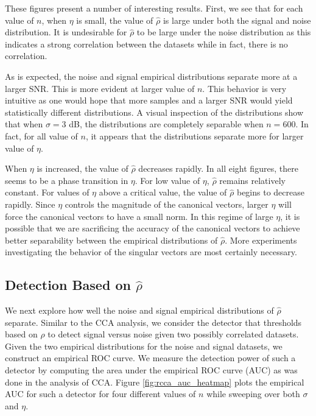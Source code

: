 These figures present a number of interesting results. First, we see that for each value
of $n$, when $\eta$ is small, the value of $\widehat{\rho}$ is large under both the signal
and noise distribution. It is undesirable for $\widehat{\rho}$ to be large under the noise
distribution as this indicates a strong correlation between the datasets while in fact,
there is no correlation. 

As is expected, the noise and signal empirical distributions separate more at a larger
SNR. This is more evident at larger value of $n$. This behavior is very intuitive as one
would hope that more samples and a larger SNR would yield statistically different
distributions. A visual inspection of the distributions show that when $\sigma=3$ dB, the
distributions are completely separable when $n=600$. In fact, for all value of $n$, it
appears that the distributions separate more for larger value of $\eta$. 

When $\eta$ is increased, the value of $\widehat{\rho}$ decreases rapidly. In all eight
figures, there seems to be a phase transition in $\eta$. For low value of $\eta$,
$\widehat{\rho}$ remains relatively constant. For values of $\eta$ above a critical value,
the value of $\widehat{\rho}$ begins to decrease rapidly. Since $\eta$ controls the
magnitude of the canonical vectors, larger $\eta$ will force the canonical vectors to have
a small norm. In this regime of large $\eta$, it is possible that we are sacrificing the
accuracy of the canonical vectors to achieve better separability between the empirical
distributions of $\widehat{\rho}$. More experiments investigating the behavior of the
singular vectors are most certainly necessary. 

\subsection{Detection Based on $\widehat{\rho}$}

We next explore how well the noise and signal empirical distributions of $\widehat{\rho}$
separate. Similar to the CCA analysis, we consider the \naive detector that thresholds
based on $\rho$ to detect signal versus noise given two possibly correlated datasets. Given
the two empirical distributions for the noise and signal datasets, we construct an
empirical ROC curve. We measure the detection power of such a detector by computing the
area under the empirical ROC curve (AUC) as was done in the analysis of CCA. Figure
\ref{fig:rcca_auc_heatmap} plots the empirical AUC for such a detector for four different
values of $n$ while sweeping over both $\sigma$ and $\eta$.

